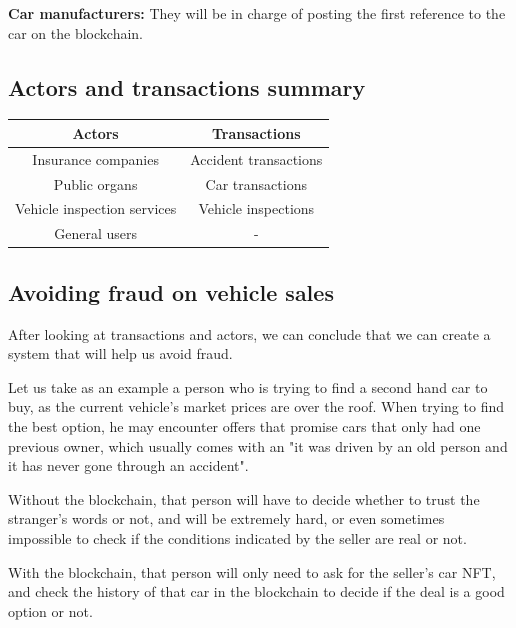 \documentclass[twocolumn]{article} %
\begin{document}
\textbf{Car manufacturers:} They will be in charge of posting the first reference to the car on the blockchain.



\subsection{Actors and transactions summary}

\begin{tabular}{|c|c|}
    \hline
    \textbf{Actors} & \textbf{Transactions} \\
    \hline
    Insurance companies & Accident transactions  \\
    \hline
    Public organs & Car transactions \\
    \hline
    Vehicle inspection services & Vehicle inspections \\
    \hline
    General users & - \\
    \hline
    
\end{tabular}

\newpage
\subsection{Avoiding fraud on vehicle sales}
After looking at transactions and actors, we can conclude that we can create a system that will help us avoid fraud. \newline

\noindent Let us take as an example a person who is trying to find a second hand car to buy, as the current vehicle's market prices are over the roof. When trying to find the best option, he may encounter offers that promise cars that only had one previous owner, which usually comes with an "it was driven by an old person and it has never gone through an accident".\newline

\noindent Without the blockchain, that person will have to decide whether to trust the stranger's words or not, and will be extremely hard, or even sometimes impossible to check if the conditions indicated by the seller are real or not.\newline

\noindent With the blockchain, that person will only need to ask for the seller's car NFT, and check the history of that car in the blockchain to decide if the deal is a good option or not.\newline
\end{document}
